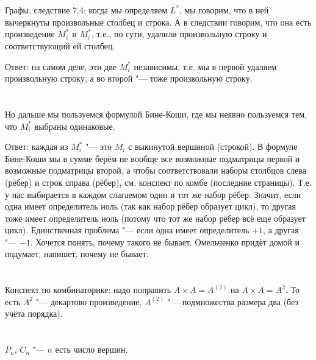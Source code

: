 

\renewcommand{\thesection}{\arabic{section}}
\rhead{}


\gdef\LectureName{Консультация по ДМ, III семестр}

\section{}
Графы, следствие 7.4: когда мы определяем $L^*$, мы говорим, что в ней вычеркнуты
произвольные столбец и строка. А в следствии говорим, что она есть произведение
$M_i^*$ и $M_i^*$, т.е., по сути, удалили произвольную строку и соответствующий ей столбец.

Ответ: на самом деле, эти две $M_i^*$ независимы, т.е. мы в первой удаляем произвольную строку,
а во второй "--- тоже произвольную строку.

\section{}
Но дальше мы пользуемся формулой Бине-Коши, где мы неявно пользуемся тем, что $M_i^*$ выбраны
одинаковые.

Ответ: каждая из $M_i^*$ "--- это $M_i$ с выкинутой вершиной (строкой).
В формуле Бине-Коши мы в сумме берём не вообще все возможные подматрицы первой и возможные подматрицы второй,
а чтобы соответствовали наборы столбцов слева (рёбер) и строк справа (рёбер), см. конспект по комбе (последние страницы).
Т.е. у нас выбирается в каждом слагаемом один и тот же набор рёбер.
Значит, если одна имеет определитель ноль (так как набор рёбер образует цикл),
то другая тоже имеет определитель ноль (потому что тот же набор рёбер всё еще образует цикл).
Единственная проблема "--- если одна имеет определитель $+1$, а другая "--- $-1$.
Хочется понять, почему такого не бывает.
Омельченко придёт домой и подумает, напишет, почему не бывает.

\section{}
Конспект по комбинаторике: надо поправить $A\times A=A^{(2)}$ на $A \times A=A^2$.
То есть $A^2$ "--- декартово произведение, $A^{(2)}$ "--- подмножества размера два
(без учёта порядка).

\section{}
$P_n$, $C_n$ "--- $n$ есть число вершин.

